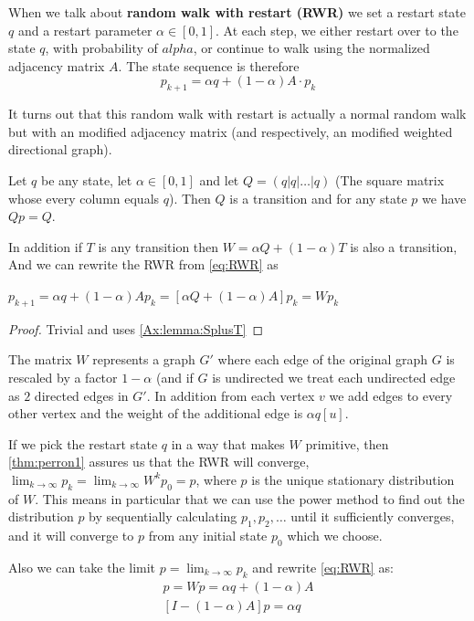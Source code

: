 When we talk about \textbf{random walk with restart (RWR)} we set a restart
state $q$ and a restart parameter $\alpha \in [0,1]$. At each step, we
either restart over to the state $q$, with probability of
$alpha$, or continue to walk using the normalized adjacency matrix
$A$. The state sequence is therefore
\begin{equation}
\label{eq:RWR}
p_{k+1} = \alpha q + (1 -
\alpha) A \cdot p_k
\end{equation}

It turns out that this random walk with restart is actually a normal
random walk but with an modified adjacency matrix (and respectively, an
modified weighted directional graph). 

\begin{lemma}
\label{lemma:Qq}
Let $q$ be any state, let $\alpha \in [0,1]$ and let  
$ Q = (q|q|\dots|q)$ (The square matrix whose every column equals $q$).
Then $Q$ is a transition and for any state $p$ we have $Qp = Q$.

In addition if $T$ is any transition then $W = \alpha Q + (1-\alpha)
T$ is also a transition, And we can rewrite the RWR from
\ref{eq:RWR} as

$p_{k+1} = \alpha q + (1 - \alpha) Ap_k = 
[\alpha Q + (1 - \alpha) A] p_k = W p_k$

\begin{proof}
Trivial and uses \ref{Ax:lemma:SplusT}
\end{proof}
\end{lemma}

The matrix $W$ represents a graph $G'$ where each edge of the
original graph $G$ is rescaled by a factor $1 - \alpha$ (and if $G$ is
undirected we treat each undirected edge as $2$ directed edges in
$G'$. In addition from each vertex $v$ we add edges to every other
vertex and the weight of the additional edge is $\alpha q[u]$.

If we pick the restart state $q$ in a way that makes $W$ primitive,
then \ref{thm:perron1} assures us that the RWR will converge,
$\lim_{k \to \infty} p_k =\lim_{k \to \infty} W^k p_0 = p$, where
$p$ is the unique stationary distribution of $W$. This means in
particular that we can use the power method to find out the
distribution $p$ by sequentially calculating $p_1, p_2, \dots$ until
it sufficiently converges, and it will converge to $p$ from any
initial state $p_0$ which we choose. 

Also we can take the limit $p = \lim_{k \to \infty}p_k$ and rewrite
\ref{eq:RWR} as:
\begin{equation}
\label{eq:RWR2}
\begin{aligned}
p = Wp = \alpha q + (1 - \alpha) A \\
[I - (1 - \alpha)A] p = \alpha q
\end{aligned}
\end{equation}

